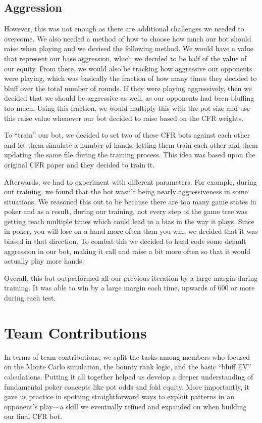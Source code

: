 \documentclass{article}
\begin{document}
    \subsection*{Aggression}

    However, this was not enough as there are additional challenges we needed to overcome. We also needed a method of how to choose how much our bot should raise when playing and we devised the following method. We would have a value that represent our base aggression, which we decided to be half of the value of our equity. From there, we would also be tracking how aggressive our opponents were playing, which was basically the fraction of how many times they decided to bluff over the total number of rounds. If they were playing aggressively, then we decided that we should be aggressive as well, as our opponents had been bluffing too much. Using this fraction, we would multiply this with the pot size and use this raise value whenever our bot decided to raise based on the CFR weights. 
    
    To ``train'' our bot, we decided to set two of these CFR bots against each other and let them simulate a number of hands, letting them train each other and them updating the same file during the training process. This idea was based upon the original CFR paper and they decided to train it. 

    Afterwards, we had to experiment with different parameters. For example, during out training, we found that the bot wasn't being nearly aggressiveness in some situations. We reasoned this out to be because there are too many game states in poker and as a result, during our training, not every step of the game tree was getting reach multiple times which could lead to a bias in the way it plays. Since in poker, you will lose on a hand more often than you win, we decided that it was biased in that direction. To combat this we decided to hard code some default aggression in our bot, making it call and raise a bit more often so that it would actually play more hands.

    Overall, this bot outperformed all our previous iteration by a large margin during training. It was able to win by a large margin each time, upwards of 600 or more during each test. 

    \section*{Team Contributions}

    In terms of team contributions, we split the tasks among members who focused on the Monte Carlo simulation, the bounty rank logic, and the basic “bluff EV” calculations. Putting it all together helped us develop a deeper understanding of fundamental poker concepts like pot odds and fold equity. More importantly, it gave us practice in spotting straightforward ways to exploit patterns in an opponent’s play—a skill we eventually refined and expanded on when building our final CFR bot.
\end{document}

